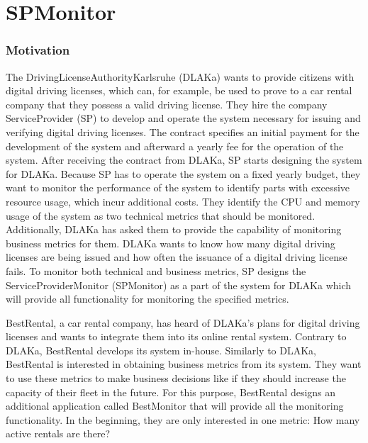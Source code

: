 \chapter{SPMonitor}





\subsection{Motivation}
The DrivingLicenseAuthorityKarlsruhe (DLAKa) wants to provide citizens with digital driving licenses,
which can, for example, be used to prove to a car rental company that they possess a valid driving license.
They hire the company ServiceProvider (SP) to develop and operate the system necessary for issuing and verifying
digital driving licenses. The contract specifies an initial payment for the development of the system
and afterward a yearly fee for the operation of the system.
After receiving the contract from DLAKa, SP starts designing the system
for DLAKa. Because SP has to operate the system on a fixed yearly budget,
they want to monitor the performance of the system to identify parts with excessive resource usage, which
incur additional costs. They identify the CPU and memory usage of the system as two technical metrics that should be monitored.
Additionally, DLAKa has asked them to provide the capability of monitoring business metrics for them.
DLAKa wants to know how many digital driving licenses are being issued and how often the issuance of a digital
driving license fails. To monitor both technical and business metrics, SP designs the ServiceProviderMonitor (SPMonitor) as a part
of the system for DLAKa which will provide all functionality for monitoring the specified metrics.

BestRental, a car rental company, has heard of DLAKa's plans for digital driving licenses
and wants to integrate them into its online rental system. Contrary to DLAKa, BestRental develops its
system in-house. Similarly to DLAKa, BestRental is interested in obtaining business metrics from its system.
They want to use these metrics to make business decisions like if they should increase the capacity of their fleet in the future.
For this purpose, BestRental designs an additional application called BestMonitor that will provide all the monitoring functionality.
In the beginning, they are only interested in one metric: How many active rentals are there?

